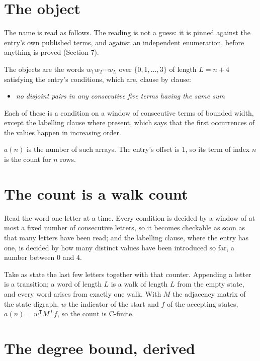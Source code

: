 \documentclass[11pt]{article}
\theoremstyle{definition}
\begin{document}
\section{The object}

The name is read as follows. The reading is not a guess: it is pinned against the entry's own published terms, and against an independent enumeration, before anything is proved (Section 7).

The objects are the words $w_1 w_2 \cdots w_L$ over $\{0,1,\dots,3\}$ of length $L = n + 4$ satisfying the entry's conditions, which are, clause by clause:

\begin{itemize}

\item {\itshape no disjoint pairs in any consecutive five terms having the same sum}

\end{itemize}

Each of these is a condition on a window of consecutive terms of bounded width, except the labelling clause where present, which says that the first occurrences of the values happen in increasing order.

$a(n)$ is the number of such arrays. The entry's offset is 1, so its term of index $n$ is the count for $n$ rows.

\section{The count is a walk count}

Read the word one letter at a time. Every condition is decided by a window of at most a fixed number of consecutive letters, so it becomes checkable as soon as that many letters have been read; and the labelling clause, where the entry has one, is decided by how many distinct values have been introduced so far, a number between $0$ and 4.

Take as state the last few letters together with that counter. Appending a letter is a transition; a word of length $L$ is a walk of length $L$ from the empty state, and every word arises from exactly one walk. With $M$ the adjacency matrix of the state digraph, $w$ the indicator of the start and $f$ of the accepting states, $a(n) = w^{\mathsf T}M^{\,L}f$, so the count is C-finite.

\section{The degree bound, derived}
\end{document}
